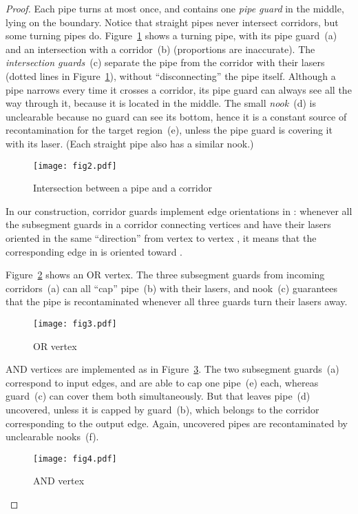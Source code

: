\documentclass{style}
\begin{document}
\begin{proof}
Each pipe turns at most once, and contains one \emph{pipe guard} in the middle, lying on the boundary. Notice that straight pipes never intersect corridors, but some turning pipes do. Figure~\ref{fig2} shows a turning pipe, with its pipe guard~(a) and an intersection with a corridor~(b) (proportions are inaccurate). The \emph{intersection guards}~(c) separate the pipe from the corridor with their lasers (dotted lines in Figure~\ref{fig2}), without ``disconnecting'' the pipe itself. Although a pipe narrows every time it crosses a corridor, its pipe guard can always see all the way through it, because it is located in the middle. The small \emph{nook}~(d) is unclearable because no guard can see its bottom, hence it is a constant source of recontamination for the target region~(e), unless the pipe guard is covering it with its laser. (Each straight pipe also has a similar nook.)

\begin{figure}[h]
\centering
\texttt{[image: fig2.pdf]}
\caption{Intersection between a pipe and a corridor}
\label{fig2}
\end{figure}

In our construction, corridor guards implement edge orientations in : whenever all the subsegment guards in a corridor connecting vertices  and  have their lasers oriented in the same ``direction'' from vertex  to vertex , it means that the corresponding edge  in  is oriented toward .

Figure~\ref{fig3} shows an OR vertex. The three subsegment guards from incoming corridors~(a) can all ``cap'' pipe~(b) with their lasers, and nook~(c) guarantees that the pipe is recontaminated whenever all three guards turn their lasers away.

\begin{figure}[h]
\centering
\texttt{[image: fig3.pdf]}
\caption{OR vertex}
\label{fig3}
\end{figure}

AND vertices are implemented as in Figure~\ref{fig4}. The two subsegment guards~(a) correspond to input edges, and are able to cap one pipe~(e) each, whereas guard~(c) can cover them both simultaneously. But that leaves pipe~(d) uncovered, unless it is capped by guard~(b), which belongs to the corridor corresponding to the output edge. Again, uncovered pipes are recontaminated by unclearable nooks~(f).

\begin{figure}[h]
\centering
\texttt{[image: fig4.pdf]}
\caption{AND vertex}
\label{fig4}
\end{figure}


\end{proof}
\end{document}
